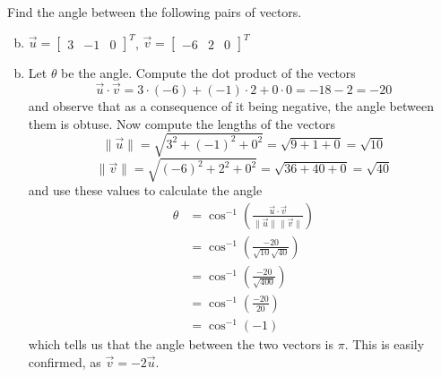 \documentclass[../main.tex]{subfiles}
\begin{document}
Find the angle between the following pairs of vectors.
\begin{enumerate}[a)]
	\setcounter{enumi}{1}
	\item
		$\vec{u} = \begin{bmatrix}3&-1&0\end{bmatrix}^T$,
		$\vec{v} = \begin{bmatrix}-6&2&0\end{bmatrix}^T$
\end{enumerate}

\solution
\begin{enumerate}[a)]
	\setcounter{enumi}{1}
	\item Let $\theta$ be the angle.
		Compute the dot product of the vectors
		\[
			\vec{u}\cdot\vec{v}
			=
			3\cdot(-6) + (-1)\cdot2 + 0\cdot0
			=
			-18 - 2
			=
			-20
		\]
		and observe that as a consequence of it being negative, the angle between them is obtuse.
		Now compute the lengths of the vectors
		\[
			\|\vec{u}\| = \sqrt{3^2 + (-1)^2 + 0^2} = \sqrt{9 + 1 + 0} = \sqrt{10}
		\]
		\[
			\|\vec{v}\| = \sqrt{(-6)^2 + 2^2 + 0^2} = \sqrt{36 + 40 + 0} = \sqrt{40}
		\]
		and use these values to calculate the angle
		\begin{align*}
		\theta &= \cos^{-1}\left(\frac{\vec{u}\cdot\vec{v}}{\|\vec{u}\|\|\vec{v}\|}\right)
			\\
			&= \cos^{-1}\left(\frac{-20}{\sqrt{10}\sqrt{40}}\right)
			\\
			&= \cos^{-1}\left(\frac{-20}{\sqrt{400}}\right)
			\\
			&= \cos^{-1}\left(\frac{-20}{20}\right)
			\\
			&= \cos^{-1}\left(-1\right)
		\end{align*}
		which tells us that the angle between the two vectors is $\pi$. This is easily confirmed, as \(\vec{v} = -2\vec{u}\).
\end{enumerate}
\end{document}
